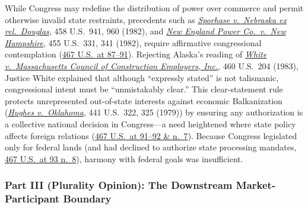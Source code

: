 \documentclass[12pt]{article}
\begin{document}
While Congress may redefine the distribution of power over commerce and permit otherwise invalid state restraints, precedents such as \href{https://supreme.justia.com/cases/federal/us/458/941/}{\textit{Sporhase v.\ Nebraska ex rel.\ Douglas}}, 458 U.S.\ 941, 960 (1982), and \href{https://supreme.justia.com/cases/federal/us/455/331/}{\textit{New England Power Co.\ v.\ New Hampshire}}, 455 U.S.\ 331, 341 (1982), require affirmative congressional contemplation (\href{https://supreme.justia.com/cases/federal/us/467/82/}{467 U.S.\ at 87--91}). Rejecting Alaska's reading of \href{https://supreme.justia.com/cases/federal/us/460/204/}{\textit{White v.\ Massachusetts Council of Construction Employers, Inc.}}, 460 U.S.\ 204 (1983), Justice White explained that although ``expressly stated'' is not talismanic, congressional intent must be ``unmistakably clear.'' This clear-statement rule protects unrepresented out-of-state interests against economic Balkanization (\href{https://supreme.justia.com/cases/federal/us/441/322/}{\textit{Hughes v.\ Oklahoma}}, 441 U.S.\ 322, 325 (1979)) by ensuring any authorization is a collective national decision in Congress---a need heightened where state policy affects foreign relations (\href{https://supreme.justia.com/cases/federal/us/467/82/}{467 U.S.\ at 91--92 \& n.\ 7}). Because Congress legislated only for federal lands (and had declined to authorize state processing mandates, \href{https://supreme.justia.com/cases/federal/us/467/82/}{467 U.S.\ at 93 n.\ 8}), harmony with federal goals was insufficient.

\subsubsection{Part III (Plurality Opinion): The Downstream Market-Participant Boundary}
\end{document}

